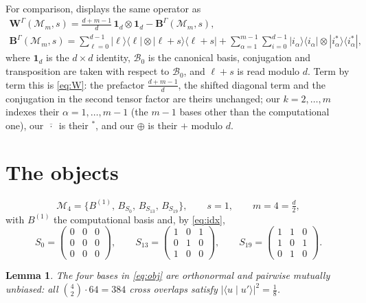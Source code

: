 \documentclass[11pt]{amsart}
\newtheorem{lemma}[theorem]{Lemma}
\newcommand{\M}{\mathcal M}
\begin{document}
For comparison, \cite{BBCHM} displays the same operator as
\begin{gather*}
  \mathbf W^{\Gamma}(\mathcal M_m,s)
  =\frac{d+m-1}{d}\,\mathbf 1_d\otimes\mathbf 1_d-\mathbf B^{\Gamma}(\mathcal M_m,s),\\
  \mathbf B^{\Gamma}(\mathcal M_m,s)
  =\sum_{\ell=0}^{d-1}|\ell\rangle\langle\ell|\otimes|\ell+s\rangle\langle\ell+s|
   +\sum_{\alpha=1}^{m-1}\sum_{i=0}^{d-1}
    |i_{\alpha}\rangle\langle i_{\alpha}|\otimes
    |i_{\alpha}^{*}\rangle\langle i_{\alpha}^{*}| ,
\end{gather*}
where $\mathbf 1_d$ is the $d\times d$ identity, $\mathcal B_0$ is the canonical basis,
conjugation and transposition are taken with respect to $\mathcal B_0$, and $\ell+s$ is
read modulo $d$. Term by term this is
\eqref{eq:W}: the prefactor $\frac{d+m-1}{d}$, the shifted diagonal term and the
conjugation in the second tensor factor are theirs unchanged; our $k=2,\dots,m$ indexes
their $\alpha=1,\dots,m-1$ (the $m-1$ bases other than the computational one), our
$\overline{\,\cdot\,}$ is their ${}^{*}$, and our $\oplus$ is their $+$ modulo $d$.

\section{The objects}

\begin{equation}\label{eq:obj}
  \M_4=\{B^{(1)},\,B_{S_0},\,B_{S_{13}},\,B_{S_{19}}\},
  \qquad s=1,\qquad m=4=\tfrac d2,
\end{equation}
with $B^{(1)}$ the computational basis and, by \eqref{eq:idx},
\[
 S_0=\begin{pmatrix}0&0&0\\0&0&0\\0&0&0\end{pmatrix},\qquad
 S_{13}=\begin{pmatrix}1&0&1\\0&1&0\\1&0&0\end{pmatrix},\qquad
 S_{19}=\begin{pmatrix}1&1&0\\1&0&1\\0&1&0\end{pmatrix}.
\]

\begin{lemma}\label{lem:mub}
The four bases in \eqref{eq:obj} are orthonormal and pairwise mutually unbiased: all
$\binom42\cdot64=384$ cross overlaps satisfy $|\langle u\mid u'\rangle|^2=\frac18$.
\end{lemma}
\end{document}
